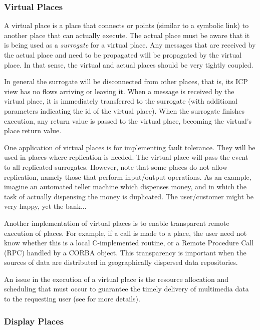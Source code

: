\documentclass[twocolumn,10pt]{article}
\begin{document}
\subsubsection*{Virtual Places}

A virtual place is a place that connects or points (similar to
a symbolic link) to another place that can actually execute.  The
actual place must be aware that it is being used as a {\em surrogate} for a 
virtual place.  Any messages that are received by the actual place and
need to be propagated will be propagated by the virtual place.  In
that sense, the virtual and actual places should be very tightly coupled.

In general the surrogate will be disconnected from other places, that is,
its ICP view has no flows arriving or leaving it.  When a message is
received by the virtual place, it is immediately transferred to the
surrogate (with additional parameters indicating the id of the
virtual place).  When the surrogate finishes execution, any return
value is passed to the virtual place, becoming the virtual's place
return value.

One application of virtual places is for implementing fault tolerance.
They will be used in places where replication is needed.  The virtual
place will pass the event to all replicated surrogates.  However, note
that some places do not allow replication, namely those that perform
input/output operations.  As an example, imagine an automated teller
machine which dispenses money, and in which the task of actually
dispensing the money is duplicated.  The user/customer might be very
happy, yet the bank...

Another implementation of virtual places is to enable transparent
remote execution of places.  For example, if a call is made to a
place, the user need not know whether this is a local C-implemented
routine, or a Remote Procedure Call (RPC) handled by a CORBA object.
This transparency is important when the sources of data are
distributed in geographically dispersed data repositories.

An issue in the execution of a virtual place
is the resource allocation and scheduling
that must occur to guarantee the timely delivery of multimedia data to
the requesting user (see \cite{mos:mmtrafic,mos:mmqos} for more details).


\subsubsection*{Display Places}
\end{document}
